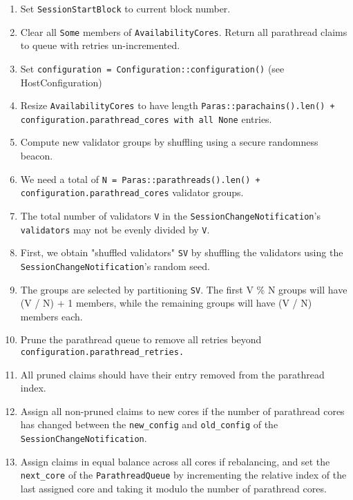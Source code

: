 \begin{enumerate}
    \item Set \verb|SessionStartBlock| to current block number.
    \item Clear all \verb|Some| members of \verb|AvailabilityCores|. Return all
    parathread claims to queue with retries un-incremented.
    \item Set \verb|configuration = Configuration::configuration()| (see HostConfiguration) 
    \item Resize \verb|AvailabilityCores| to have length
    \verb|Paras::parachains().len() +|
    \newline
    \verb|configuration.parathread_cores with all None| entries.
    \item Compute new validator groups by shuffling using a secure randomness
    beacon.
    \item We need a total of \verb|N = Paras::parathreads().len() +|
    \verb|configuration.parathread_cores| validator groups.
    \item The total number of validators \verb|V| in the \verb|SessionChangeNotification|'s
    \verb|validators| may not be evenly divided by \verb|V|.
    \item First, we obtain
    "shuffled validators" \verb|SV| by shuffling the validators using the
    \verb|SessionChangeNotification|'s random seed.
    \item The groups are selected
    by partitioning \verb|SV|. The first V \% N groups will have (V / N) + 1 members,
    while the remaining groups will have (V / N) members each. 
    \item Prune the parathread queue to remove all retries beyond
    \verb|configuration.parathread_retries.|
    \item All pruned claims should have
    their entry removed from the parathread index.
    \item Assign all
    non-pruned claims to new cores if the number of parathread cores has changed
    between the \verb|new_config| and \verb|old_config| of the \verb|SessionChangeNotification|.
    \item Assign claims in equal balance across all cores if rebalancing, and
    set the \verb|next_core| of the \verb|ParathreadQueue| by incrementing the relative index
    of the last assigned core and taking it modulo the number of parathread
    cores.
\end{enumerate}

